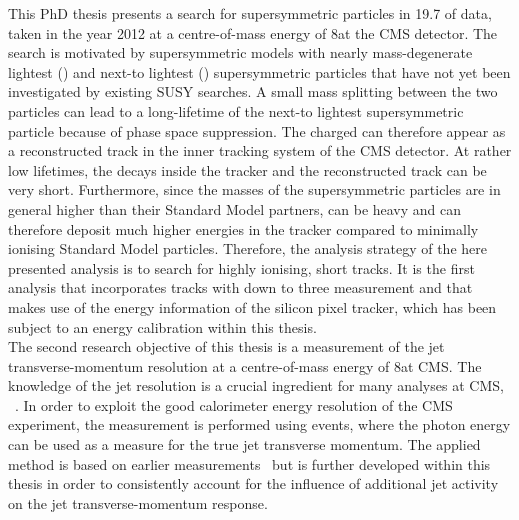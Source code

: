 This PhD thesis presents a search for supersymmetric particles in 19.7 \fbinv of data, taken in the year 2012 at a centre-of-mass energy of 8\tev at the CMS detector. 
The search is motivated by supersymmetric models with nearly mass-degenerate lightest (\chiO) and next-to lightest (\chipm) supersymmetric particles that have not yet been investigated by existing SUSY searches.       
A small mass splitting between the two particles can lead to a long-lifetime of the next-to lightest supersymmetric particle \chipm because of phase space suppression.
The charged \chipm can therefore appear as a reconstructed track in the inner tracking system of the CMS detector.
At rather low \chipm lifetimes, the \chipm decays inside the tracker and the reconstructed track can be very short.  
Furthermore, since the masses of the supersymmetric particles are in general higher than their Standard Model partners, \chipm can be heavy and can therefore deposit much higher energies in the tracker compared to minimally ionising Standard Model particles.
Therefore, the analysis strategy of the here presented analysis is to search for highly ionising, short tracks.
It is the first analysis that incorporates tracks with down to three measurement and that makes use of the energy information of the silicon pixel tracker, which has been subject to an energy calibration within this thesis.\\

\vspace{-2pt}
The second research objective of this thesis is a measurement of the jet transverse-momentum resolution at a centre-of-mass energy of 8\tev at CMS.
The knowledge of the jet \pt resolution is a crucial ingredient for many analyses at CMS, \eg~\cite{bib:CMS:QCD_measurements,bib:CMS:TopCrossSection_8TeV,bib:CMS:RA2_8TeV}.
In order to exploit the good calorimeter energy resolution of the CMS experiment, the measurement is performed using \GAMJET events, where the photon energy can be used as a measure for the true jet transverse momentum.
The applied method is based on earlier measurements~\cite{bib:CMS:JERCPaper_2011,CMS:PAS:JETResolution_7TeV} but is further developed within this thesis in order to consistently account for the influence of additional jet activity on the jet transverse-momentum response.\\

\vspace{-2pt}

